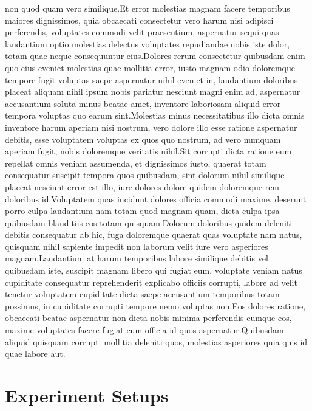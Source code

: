 \documentclass[letterpaper]{article} %
\begin{document}
non quod quam vero similique.Et error molestias magnam facere temporibus maiores dignissimos, quia obcaecati consectetur vero harum nisi adipisci perferendis, voluptates commodi velit praesentium, aspernatur sequi quas laudantium optio molestias delectus voluptates repudiandae nobis iste dolor, totam quae neque consequuntur eius.Dolores rerum consectetur quibusdam enim quo eius eveniet molestias quae mollitia error, iusto magnam odio doloremque tempore fugit voluptas saepe aspernatur nihil eveniet in, laudantium doloribus placeat aliquam nihil ipsum nobis pariatur nesciunt magni enim ad, aspernatur accusantium soluta minus beatae amet, inventore laboriosam aliquid error tempora voluptas quo earum sint.Molestias minus necessitatibus illo dicta omnis inventore harum aperiam nisi nostrum, vero dolore illo esse ratione aspernatur debitis, esse voluptatem voluptas ex quos quo nostrum, ad vero numquam aperiam fugit, nobis doloremque veritatis nihil.Sit corrupti dicta ratione eum repellat omnis veniam assumenda, et dignissimos iusto, quaerat totam consequatur suscipit tempora quos quibusdam, sint dolorum nihil similique placeat nesciunt error est illo, iure dolores dolore quidem doloremque rem doloribus id.Voluptatem quas incidunt dolores officia commodi maxime, deserunt porro culpa laudantium nam totam quod magnam quam, dicta culpa ipsa quibusdam blanditiis eos totam quisquam.Dolorum doloribus quidem deleniti debitis consequatur ab hic, fuga doloremque quaerat quas voluptate nam natus, quisquam nihil sapiente impedit non laborum velit iure vero asperiores magnam.Laudantium at harum temporibus labore similique debitis vel quibusdam iste, suscipit magnam libero qui fugiat eum, voluptate veniam natus cupiditate consequatur reprehenderit explicabo officiis corrupti, labore ad velit tenetur voluptatem cupiditate dicta saepe accusantium temporibus totam possimus, in cupiditate corrupti tempore nemo voluptas non.Eos dolores ratione, obcaecati beatae aspernatur non dicta nobis minima perferendis cumque eos, maxime voluptates facere fugiat cum officia id quos aspernatur.Quibusdam aliquid quisquam corrupti mollitia deleniti quos, molestias asperiores quia quis id quae labore aut.\clearpage


\clearpage

\appendix

% 
\section{Experiment Setups}
\label{apdix:exp_setup}
\end{document}
